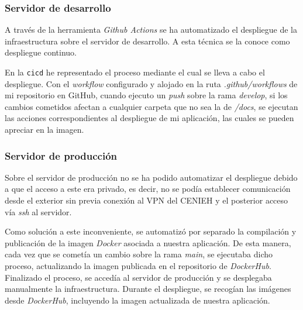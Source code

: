 \subsubsection{Servidor de desarrollo}

A través de la herramienta \emph{Github Actions} se ha automatizado el
despliegue de la infraestructura sobre el servidor de desarrollo. A esta
técnica se la conoce como despliegue continuo.


En la \texttt{cicd} he representado el proceso mediante el cual se lleva
a cabo el despliegue. Con el \emph{workflow} configurado y alojado en la
ruta \emph{.github/workflows} de mi repositorio en GitHub, cuando
ejecuto un \emph{push} sobre la rama \emph{develop}, si los cambios
cometidos afectan a cualquier carpeta que no sea la de \emph{/docs}, se
ejecutan las acciones correspondientes al despliegue de mi aplicación,
las cuales se pueden apreciar en la imagen.


\subsubsection{Servidor de producción}

Sobre el servidor de producción no se ha podido automatizar el
despliegue debido a que el acceso a este era privado, es decir, no se
podía establecer comunicación desde el exterior sin previa conexión al
VPN del CENIEH y el posterior acceso vía \emph{ssh} al servidor.


Como solución a este inconveniente, se automatizó por separado la
compilación y publicación de la imagen \emph{Docker} asociada a nuestra
aplicación. De esta manera, cada vez que se cometía un cambio sobre la
rama \emph{main}, se ejecutaba dicho proceso, actualizando la imagen
publicada en el repositorio de \emph{DockerHub}. Finalizado el proceso,
se accedía al servidor de producción y se desplegaba manualmente la
infraestructura. Durante el despliegue, se recogían las imágenes desde
\emph{DockerHub}, incluyendo la imagen actualizada de nuestra
aplicación.
